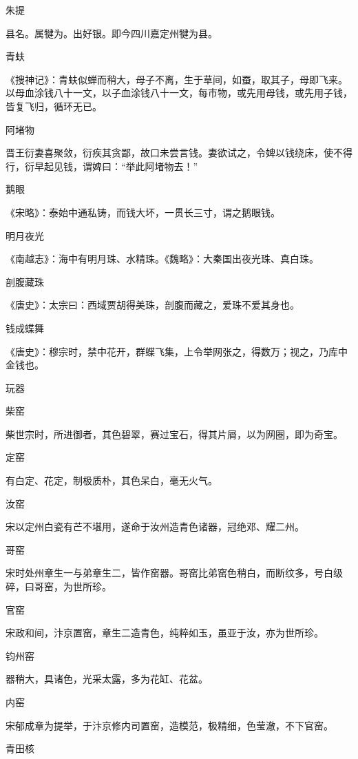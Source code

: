 \documentclass[a4paper,12pt,UTF8,twoside]{ctexbook}
\begin{document}
    朱提
    
    县名。属犍为。出好银。即今四川嘉定州犍为县。
    
    青蚨
    
    《搜神记》：青蚨似蝉而稍大，母子不离，生于草间，如蚕，取其子，母即飞来。以母血涂钱八十一文，以子血涂钱八十一文，每市物，或先用母钱，或先用子钱，皆复飞归，循环无已。
    
    阿堵物
    
    晋王衍妻喜聚敛，衍疾其贪鄙，故口未尝言钱。妻欲试之，令婢以钱绕床，使不得行，衍早起见钱，谓婢曰：“举此阿堵物去！”
    
    鹅眼
    
    《宋略》：泰始中通私铸，而钱大坏，一贯长三寸，谓之鹅眼钱。
    
    明月夜光
    
    《南越志》：海中有明月珠、水精珠。《魏略》：大秦国出夜光珠、真白珠。
    
    剖腹藏珠
    
    《唐史》：太宗曰：西域贾胡得美珠，剖腹而藏之，爱珠不爱其身也。
    
    钱成蝶舞
    
    《唐史》：穆宗时，禁中花开，群蝶飞集，上令举网张之，得数万；视之，乃库中金钱也。
    
    玩器
    
    柴窑
    
    柴世宗时，所进御者，其色碧翠，赛过宝石，得其片屑，以为网圈，即为奇宝。
    
    定窑
    
    有白定、花定，制极质朴，其色呆白，毫无火气。
    
    汝窑
    
    宋以定州白瓷有芒不堪用，遂命于汝州造青色诸器，冠绝邓、耀二州。
    
    哥窑
    
    宋时处州章生一与弟章生二，皆作窑器。哥窑比弟窑色稍白，而断纹多，号白级碎，曰哥窑，为世所珍。
    
    官窑
    
    宋政和间，汴京置窑，章生二造青色，纯粹如玉，虽亚于汝，亦为世所珍。
    
    钧州窑
    
    器稍大，具诸色，光采太露，多为花缸、花盆。
    
    内窑
    
    宋郁成章为提举，于汴京修内司置窑，造模范，极精细，色莹澈，不下官窑。
    
    青田核
    
\end{document}
